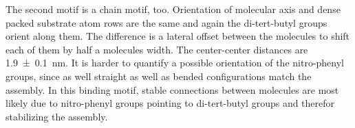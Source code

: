 The second motif is a chain motif, too. Orientation of molecular axis and dense packed substrate atom rows are the same and again the di-tert-butyl groups orient along them. The difference is a lateral offset between the molecules to shift each of them by half a molecules width. The center-center distances are \SI{1.9 \pm 0.1}{\nano \meter}. It is harder to quantify a possible orientation of the nitro-phenyl groups, since as well straight as well as bended configurations match the assembly. In this binding motif, stable connections between molecules are most likely due to nitro-phenyl groups pointing to di-tert-butyl groups and therefor stabilizing the assembly.

